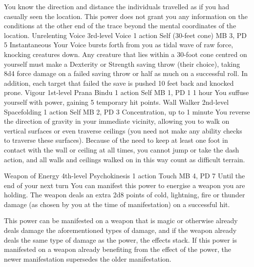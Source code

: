 You know the direction and distance the individuals travelled
as if you had casually seen the location. This power does
not grant you any information on the conditions at the other
end of the trace beyond the mental coordinates of the location.
\DndPowerHeader%
    {Unrelenting Voice\label{pwr:unrelenting_voice}}
    {3rd-level Voice}
    {1 action}
    {Self (30-feet cone)}
    {MB 3, PD 5}
    {Instantaneous}
Your Voice bursts forth from you as tidal
wave of raw force, knocking creatures down. Any creature that
lies within a 30-foot cone centred on yourself must make a
Dexterity or Strength saving throw (their choice), taking
8d4 force damage on a failed saving throw or half as much
on a successful roll. In addition, each target that failed
the save is pushed 10 feet back and knocked prone.
\DndPowerHeader%
    {Vigour\label{pwr:vigour}}
    {1st-level Prana Bindu}
    {1 action}
    {Self}
    {MB 1, PD 1}
    {1 hour}
You suffuse yourself with power, gaining
5 temporary hit points.
\DndPowerHeader%
    {Wall Walker\label{pwr:wall_walker}}
    {2nd-level Spacefolding}
    {1 action}
    {Self}
    {MB 2, PD 3}
    {Concentration, up to 1 minute}
You reverse the direction of gravity in your
immediate vicinity, allowing you to walk on vertical surfaces
or even traverse ceilings (you need not make any ability checks
to traverse these surfaces). Because of the need to keep at
least one foot in contact with the wall or ceiling at all
times, you cannot jump or take the dash action, and all walls
and ceilings walked on in this way count as difficult terrain.

\DndPowerHeader%
    {Weapon of Energy\label{pwr:weapon_of_energy}}
    {4th-level Psychokinesis}
    {1 action}
    {Touch}
    {MB 4, PD 7}
    {Until the end of your next turn}
You can manifest this power to energise a
weapon you are holding. The weapon deals an extra 2d8 points
of cold, lightning, fire or thunder damage (as chosen by you
at the time of manifestation) on a successful hit.

This power can be manifested on a weapon that is magic or
otherwise already deals damage the aforementioned types of
damage, and if the weapon already deals the same type of damage
as the power, the effects stack. If this power is manifested
on a weapon already benefiting from the effect of the power,
the newer manifestation supersedes the older manifestation.

